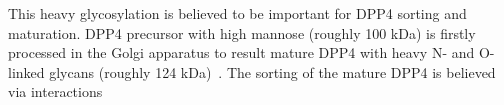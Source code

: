 This heavy glycosylation is believed to be important for DPP4 sorting and maturation. DPP4 precursor with high mannose (roughly 100 kDa) is firstly processed in the Golgi apparatus to result mature DPP4 with heavy N- and O-linked glycans (roughly 124 kDa)~\cite{Matter_1991}. The sorting of the mature DPP4 is believed via interactions 